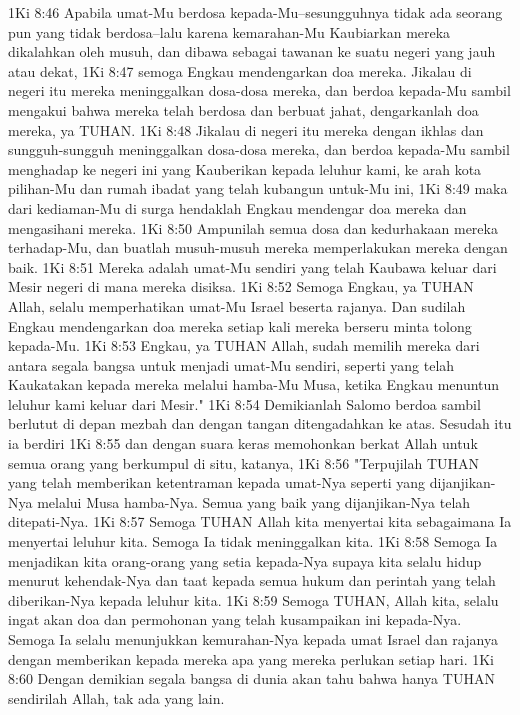 1Ki 8:46  Apabila umat-Mu berdosa kepada-Mu--sesungguhnya tidak ada seorang pun yang tidak berdosa--lalu karena kemarahan-Mu Kaubiarkan mereka dikalahkan oleh musuh, dan dibawa sebagai tawanan ke suatu negeri yang jauh atau dekat,
1Ki 8:47  semoga Engkau mendengarkan doa mereka. Jikalau di negeri itu mereka meninggalkan dosa-dosa mereka, dan berdoa kepada-Mu sambil mengakui bahwa mereka telah berdosa dan berbuat jahat, dengarkanlah doa mereka, ya TUHAN.
1Ki 8:48  Jikalau di negeri itu mereka dengan ikhlas dan sungguh-sungguh meninggalkan dosa-dosa mereka, dan berdoa kepada-Mu sambil menghadap ke negeri ini yang Kauberikan kepada leluhur kami, ke arah kota pilihan-Mu dan rumah ibadat yang telah kubangun untuk-Mu ini,
1Ki 8:49  maka dari kediaman-Mu di surga hendaklah Engkau mendengar doa mereka dan mengasihani mereka.
1Ki 8:50  Ampunilah semua dosa dan kedurhakaan mereka terhadap-Mu, dan buatlah musuh-musuh mereka memperlakukan mereka dengan baik.
1Ki 8:51  Mereka adalah umat-Mu sendiri yang telah Kaubawa keluar dari Mesir negeri di mana mereka disiksa.
1Ki 8:52  Semoga Engkau, ya TUHAN Allah, selalu memperhatikan umat-Mu Israel beserta rajanya. Dan sudilah Engkau mendengarkan doa mereka setiap kali mereka berseru minta tolong kepada-Mu.
1Ki 8:53  Engkau, ya TUHAN Allah, sudah memilih mereka dari antara segala bangsa untuk menjadi umat-Mu sendiri, seperti yang telah Kaukatakan kepada mereka melalui hamba-Mu Musa, ketika Engkau menuntun leluhur kami keluar dari Mesir."
1Ki 8:54  Demikianlah Salomo berdoa sambil berlutut di depan mezbah dan dengan tangan ditengadahkan ke atas. Sesudah itu ia berdiri
1Ki 8:55  dan dengan suara keras memohonkan berkat Allah untuk semua orang yang berkumpul di situ, katanya,
1Ki 8:56  "Terpujilah TUHAN yang telah memberikan ketentraman kepada umat-Nya seperti yang dijanjikan-Nya melalui Musa hamba-Nya. Semua yang baik yang dijanjikan-Nya telah ditepati-Nya.
1Ki 8:57  Semoga TUHAN Allah kita menyertai kita sebagaimana Ia menyertai leluhur kita. Semoga Ia tidak meninggalkan kita.
1Ki 8:58  Semoga Ia menjadikan kita orang-orang yang setia kepada-Nya supaya kita selalu hidup menurut kehendak-Nya dan taat kepada semua hukum dan perintah yang telah diberikan-Nya kepada leluhur kita.
1Ki 8:59  Semoga TUHAN, Allah kita, selalu ingat akan doa dan permohonan yang telah kusampaikan ini kepada-Nya. Semoga Ia selalu menunjukkan kemurahan-Nya kepada umat Israel dan rajanya dengan memberikan kepada mereka apa yang mereka perlukan setiap hari.
1Ki 8:60  Dengan demikian segala bangsa di dunia akan tahu bahwa hanya TUHAN sendirilah Allah, tak ada yang lain.
